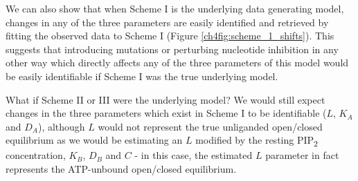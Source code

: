 We can also show that when Scheme I is the underlying data generating model, changes in any of the three parameters are easily identified and retrieved by fitting the observed data to Scheme I (Figure \ref{ch4fig:scheme_1_shifts}).
This suggests that introducing mutations or perturbing nucleotide inhibition in any other way which directly affects any of the three parameters of this model would be easily identifiable if Scheme I was the true underlying model.

What if Scheme II or III were the underlying model?
We would still expect changes in the three parameters which exist in Scheme I to be identifiable ($L$, $K_A$ and $D_A$), although $L$ would not represent the true unliganded open/closed equilibrium as we would be estimating an $L$ modified by the resting PIP\textsubscript{2} concentration, $K_B$, $D_B$ and $C$ - in this case, the estimated $L$ parameter in fact represents the ATP-unbound open/closed equilibrium.

